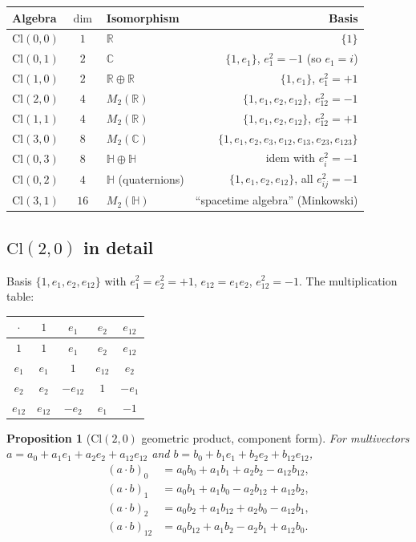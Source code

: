 \documentclass[11pt,a4paper]{article}
\newtheorem{proposition}[theorem]{Proposition}
\theoremstyle{remark}
\newcommand{\R}{\mathbb{R}}
\newcommand{\C}{\mathbb{C}}
\newcommand{\Cl}[2]{\mathrm{Cl}(#1, #2)}
\newcommand{\Quat}{\mathbb{H}}
\begin{document}
\begin{center}
\begin{tabular}{lclr}
\toprule
Algebra & $\dim$ & Isomorphism & Basis \\
\midrule
$\Cl{0}{0}$ & $1$ & $\R$ & $\{1\}$ \\
$\Cl{0}{1}$ & $2$ & $\C$ & $\{1, e_1\}$, $e_1^2 = -1$ (so $e_1 = i$) \\
$\Cl{1}{0}$ & $2$ & $\R \oplus \R$ & $\{1, e_1\}$, $e_1^2 = +1$ \\
$\Cl{2}{0}$ & $4$ & $M_2(\R)$ & $\{1, e_1, e_2, e_{12}\}$, $e_{12}^2 = -1$ \\
$\Cl{1}{1}$ & $4$ & $M_2(\R)$ & $\{1, e_1, e_2, e_{12}\}$, $e_{12}^2 = +1$ \\
$\Cl{3}{0}$ & $8$ & $M_2(\C)$ & $\{1, e_1, e_2, e_3, e_{12}, e_{13}, e_{23}, e_{123}\}$ \\
$\Cl{0}{3}$ & $8$ & $\Quat \oplus \Quat$ & idem with $e_i^2 = -1$ \\
$\Cl{0}{2}$ & $4$ & $\Quat$ (quaternions) & $\{1, e_1, e_2, e_{12}\}$, all $e_{ij}^2 = -1$ \\
$\Cl{3}{1}$ & $16$ & $M_2(\Quat)$ & ``spacetime algebra'' (Minkowski) \\
\bottomrule
\end{tabular}
\end{center}

\subsection{$\Cl{2}{0}$ in detail}

Basis $\{1, e_1, e_2, e_{12}\}$ with $e_1^2 = e_2^2 = +1$,
$e_{12} = e_1 e_2$, $e_{12}^2 = -1$. The multiplication table:

\begin{center}
\begin{tabular}{c|cccc}
$\cdot$ & $1$ & $e_1$ & $e_2$ & $e_{12}$ \\
\hline
$1$ & $1$ & $e_1$ & $e_2$ & $e_{12}$ \\
$e_1$ & $e_1$ & $1$ & $e_{12}$ & $e_2$ \\
$e_2$ & $e_2$ & $-e_{12}$ & $1$ & $-e_1$ \\
$e_{12}$ & $e_{12}$ & $-e_2$ & $e_1$ & $-1$ \\
\end{tabular}
\end{center}

\begin{proposition}[$\Cl{2}{0}$ geometric product, component form]
For multivectors $a = a_0 + a_1 e_1 + a_2 e_2 + a_{12} e_{12}$
and $b = b_0 + b_1 e_1 + b_2 e_2 + b_{12} e_{12}$,
\begin{align*}
  (a \cdot b)_0    &= a_0 b_0 + a_1 b_1 + a_2 b_2 - a_{12} b_{12}, \\
  (a \cdot b)_1    &= a_0 b_1 + a_1 b_0 - a_2 b_{12} + a_{12} b_2, \\
  (a \cdot b)_2    &= a_0 b_2 + a_1 b_{12} + a_2 b_0 - a_{12} b_1, \\
  (a \cdot b)_{12} &= a_0 b_{12} + a_1 b_2 - a_2 b_1 + a_{12} b_0.
\end{align*}
\end{proposition}
\end{document}
